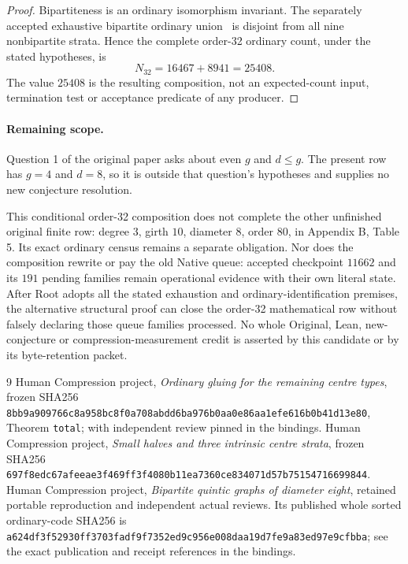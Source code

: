 \documentclass[11pt]{article}
\begin{document}
\begin{proof}
Bipartiteness is an ordinary isomorphism invariant. The separately
accepted exhaustive bipartite ordinary union~\cite{bipartite} is
disjoint from all nine nonbipartite strata. Hence the complete order-32
ordinary count, under the stated hypotheses, is
\[
 N_{32}=16467+8941=25408.
\]
The value $25408$ is the resulting composition, not an expected-count
input, termination test or acceptance predicate of any producer.
\end{proof}

\paragraph{Remaining scope.}
Question 1 of the original paper asks about even $g$ and $d\leq g$.
The present row has $g=4$ and $d=8$, so it is outside that question's
hypotheses and supplies no new conjecture resolution.

This conditional order-32 composition does not complete the other
unfinished original finite row: degree $3$, girth $10$, diameter $8$,
order $80$, in Appendix B, Table 5. Its exact ordinary census remains a
separate obligation. Nor does the composition rewrite or pay the old
Native queue: accepted checkpoint $11662$ and its $191$ pending families
remain operational evidence with their own literal state. After Root
adopts all the stated exhaustion and ordinary-identification premises,
the alternative structural proof can close the order-32 mathematical
row without falsely declaring those queue families processed. No whole
Original, Lean, new-conjecture or compression-measurement credit is
asserted by this candidate or by its byte-retention packet.

\begin{thebibliography}{9}
 Human Compression project,
\emph{Ordinary gluing for the remaining centre types}, frozen SHA256
\texttt{8bb9a909766c8a958bc8f0a708abdd6ba976b0aa0e86aa1efe616b0b41d13e80},
Theorem \texttt{total}; with independent review pinned in the bindings.
 Human Compression project,
\emph{Small halves and three intrinsic centre strata}, frozen SHA256
\texttt{697f8edc67afeeae3f469ff3f4080b11ea7360ce834071d57b75154716699844}.
 Human Compression project,
\emph{Bipartite quintic graphs of diameter eight}, retained portable
reproduction and independent actual reviews. Its published whole sorted
ordinary-code SHA256 is
\texttt{a624df3f52930ff3703fadf9f7352ed9c956e008daa19d7fe9a83ed97e9cfbba};
see the exact publication and receipt references in the bindings.
\end{thebibliography}
\end{document}
